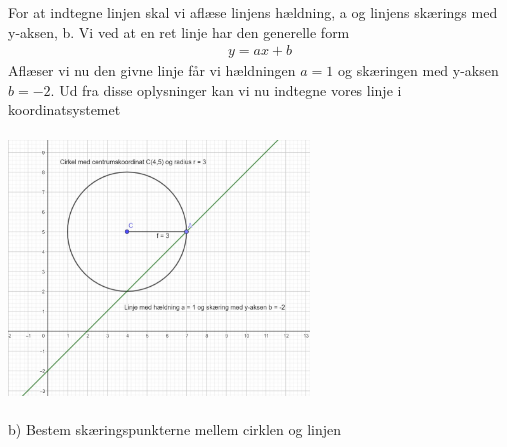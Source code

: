  For at indtegne linjen skal vi aflæse linjens hældning, a og linjens skærings med y-aksen, b. Vi ved at en ret linje har den generelle form
 \begin{align*}
     y = ax+b
 \end{align*}
 Aflæser vi nu den givne linje får vi hældningen $a = 1$ og skæringen med y-aksen $b = -2$. Ud fra disse oplysninger kan vi nu indtegne vores linje i koordinatsystemet\\\\
 \includegraphics[width = 8cm]{Opgave_11-20/Opgave_16/16.1.jpg}\\\\
 
 b) Bestem skæringspunkterne mellem cirklen og linjen\\\\

 \ans
 
